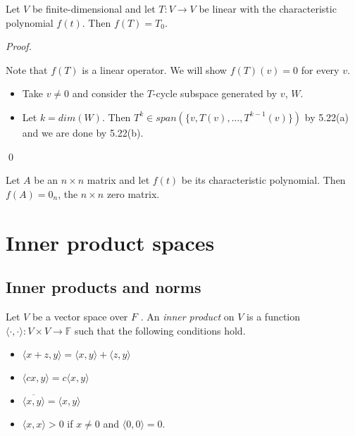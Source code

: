 \documentclass[12pt]{article}
\newenvironment{theorem}[2][Theorem]{\begin{trivlist}
\item[\hskip \labelsep {\bfseries #1}\hskip \labelsep {\bfseries #2.}]}{\end{trivlist}}
\newenvironment{corollary}[2][Corollary]{\begin{trivlist}
\item[\hskip \labelsep {\bfseries #1}\hskip \labelsep {\bfseries #2}]}{\end{trivlist}}
\newenvironment{definition}[2][Definition]{\begin{trivlist}
\item[\hskip \labelsep {\bfseries #1}\hskip \labelsep {\bfseries #2}]}{\end{trivlist}}
\newenvironment{sol}
    {\emph{Proof.}
    }
    {
    \qed
    }
\begin{document}
\begin{theorem}{5.23, Cayley-Hamilton}
Let $V$ be finite-dimensional and let $T : V \to V$ be linear with the characteristic polynomial $f(t)$. Then $f(T) = T_0$.
\end{theorem}

\begin{sol}
Note that $f(T)$ is a linear operator. We will show $f(T)(v) = 0$ for every $v$.

\begin{itemize}
    \item Take $v \neq 0$ and consider the $T$-cycle subspace generated by $v$, $W$.
    
    \item Let $k = dim(W)$. Then $T^k \in span(\{v, T(v), \dots, T^{k-1}(v)\})$ by 5.22(a) and we are done by 5.22(b).
\end{itemize}
\end{sol}

\begin{corollary}{15}
Let $A$ be an $n \times n$ matrix and let $f(t)$ be its characteristic polynomial. Then $f(A) = 0_n$, the $n \times n$ zero matrix.
\end{corollary}

\section{Inner product spaces}

\subsection{Inner products and norms}

\begin{definition}{1}
Let $V$ be a vector space over $F$ . An \textit{inner product} on $V$ is a function $\langle \cdot, \cdot \rangle : V \times V \to \mathbb{F}$ such that the following conditions hold. 
\begin{itemize}
    \item $\langle x + z, y \rangle = \langle x, y \rangle + \langle z,y \rangle$
    
    \item $\langle cx, y \rangle = c\langle x, y \rangle$
    
    \item $\overline{\langle x, y \rangle} = \langle x, y \rangle$
    
    \item $\langle x, x \rangle > 0$ if $x \neq 0$ and $\langle 0, 0 \rangle = 0$.
\end{itemize}
\end{definition}
\end{document}
